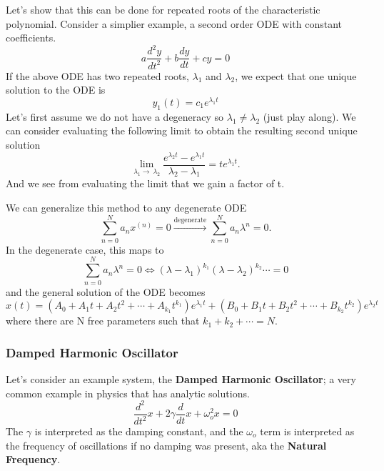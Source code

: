 \documentclass{article}
\newcommand{\be}{\begin{equation}}
\newcommand{\ee}{\end{equation}}
\begin{document}
Let's show that this can be done for repeated roots of the characteristic polynomial.
Consider a simplier example, a second order ODE with constant coefficients.
\be \label{eq:lin_cc_homo_reproot}
a\frac{d^2 y}{dt^2} + b\frac{d y}{dt} + cy = 0
\ee
If the above ODE has two repeated roots, $\lambda_1$ and $\lambda_2$, we expect that one unique solution to the ODE is
\be
y_1(t) = c_1 e^{\lambda_1 t}
\ee
Let's first assume we do not have a degeneracy so $\lambda_1 \neq \lambda_2$ (just play along).
We can consider evaluating the following limit to obtain the resulting second unique solution
\be
\lim_{\lambda_1\to\ \lambda_2} \frac{e^{\lambda_2 t} - e^{\lambda_1 t}}{\lambda_2 - \lambda_1} = t e^{\lambda_1 t} .
\ee
And we see from evaluating the limit that we gain a factor of t.

We can generalize this method to any degenerate ODE
\be
\sum_{n=0}^N a_n x^{(n)} = 0 \xrightarrow{\text{degenerate}} \sum_{n=0}^N a_n \lambda^n = 0 .
\ee
In the degenerate case, this maps to
\be
\sum_{n=0}^N a_n \lambda^n = 0 \Leftrightarrow (\lambda - \lambda_1)^{k_1} (\lambda - \lambda_2)^{k_2} \cdots = 0
\ee
and the general solution of the ODE becomes
\be
x(t) = \left( A_0 + A_1t + A_2t^2 + \cdots + A_{k_1} t^{k_1}\right) e^{\lambda_1t} + \left( B_0 + B_1t + B_2t^2 + \cdots + B_{k_2} t^{k_2}\right) e^{\lambda_2t}
\ee
where there are N free parameters such that $k_1 + k_2 + \cdots = N$.

\subsubsection*{Damped Harmonic Oscillator}
Let's consider an example system, the \textbf{Damped Harmonic Oscillator}; a very common example in physics that has analytic solutions.
\be \label{eq:damp_oscillator}
\frac{d^2}{dt^2} x + 2\gamma \frac{d}{dt} x + \omega_o^2 x = 0
\ee
The $\gamma$ is interpreted as the damping constant, and the $\omega_o$ term is interpreted as the frequency of oscillations if no damping was present, aka the \textbf{Natural Frequency}.
\end{document}
